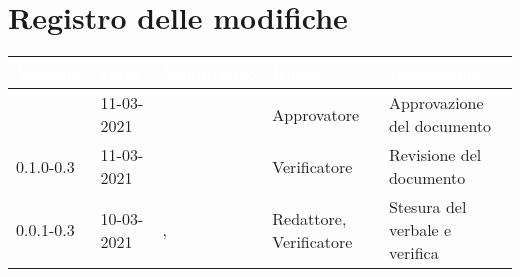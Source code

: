 \section*{Registro delle modifiche}
{
\setcounter{table}{-1}
{
\renewcommand{\arraystretch}{1.5}
\centering
\begin{longtable}{C{1.7cm} | C{2.5cm} | C{3.2cm} | C{2.7cm} | C{4.8cm}}
\textcolor{white}{\textbf{Versione}}&
\textcolor{white}{\textbf{Data}}&
\textcolor{white}{\textbf{Nominativo}}&
\textcolor{white}{\textbf{Ruolo}}&
\textcolor{white}{\textbf{Descrizione}}\\	
\endhead

\Versionedoc{} & 11-03-2021 & \Approvatore{} & Approvatore & Approvazione del documento\\	
0.1.0-0.3 & 11-03-2021 & \SH{} & Verificatore & Revisione del documento\\		
0.0.1-0.3 & 10-03-2021 & \Redattori{}, \Verificatori{} & Redattore, Verificatore & Stesura del verbale e verifica\\
		
\end{longtable}
}
}
